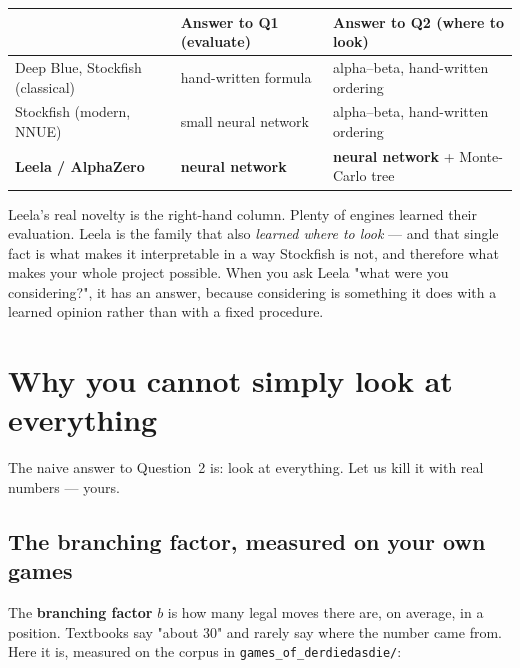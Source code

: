 \begin{center}
\begin{tabular}{@{}lll@{}}
\toprule
 & \textbf{Answer to Q1 (evaluate)} & \textbf{Answer to Q2 (where to look)} \\
\midrule
Deep Blue, Stockfish (classical) & hand-written formula & alpha--beta, hand-written ordering \\
Stockfish (modern, NNUE)         & small neural network & alpha--beta, hand-written ordering \\
\textbf{Leela / AlphaZero}       & \textbf{neural network} & \textbf{neural network} + Monte-Carlo tree \\
\bottomrule
\end{tabular}
\end{center}

Leela's real novelty is the right-hand column. Plenty of engines learned their evaluation.
Leela is the family that also \emph{learned where to look} --- and that single fact is what
makes it interpretable in a way Stockfish is not, and therefore what makes your whole
project possible. When you ask Leela "what were you considering?", it has an answer, because
considering is something it does with a learned opinion rather than with a fixed procedure.

\section{Why you cannot simply look at everything}

The naive answer to Question~2 is: look at everything. Let us kill it with real numbers ---
yours.

\subsection{The branching factor, measured on your own games}

The \textbf{branching factor} $b$ is how many legal moves there are, on average, in a
position. Textbooks say "about 30" and rarely say where the number came from. Here it is,
measured on the corpus in \texttt{games\_of\_derdiedasdie/}:

